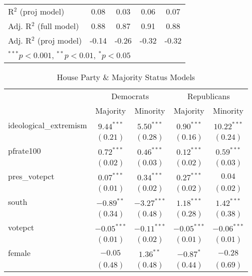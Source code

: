 \documentclass[12pt]{article}
\begin{document}
\begin{table}
\begin{center}
\begin{tabular}{l c c c c }
			R$^2$ (proj model)      & 0.08         & 0.03         & 0.06         & 0.07         \\
			Adj. R$^2$ (full model) & 0.88         & 0.87         & 0.91         & 0.88         \\
			Adj. R$^2$ (proj model) & -0.14        & -0.26        & -0.32        & -0.32        \\
			\hline
			\multicolumn{5}{l}{\scriptsize{$^{***}p<0.001$, $^{**}p<0.01$, $^*p<0.05$}}
		\end{tabular}
	\end{center}
\end{table}	

\begin{table}
	\begin{center}
		\caption{House Party \& Majority Status Models}
		\begin{tabular}{l c c c c }
			\hline
			& \multicolumn{2}{c}{Democrats} & \multicolumn{2}{c}{Republicans} \\
			\cline{2-5}
			& Majority & Minority & Majority & Minority \\
			\hline
			ideological\_extremism & $9.44^{***}$  & $5.50^{***}$  & $0.90^{***}$  & $10.22^{***}$ \\
			& $(0.21)$      & $(0.28)$      & $(0.16)$      & $(0.24)$      \\
			pfrate100              & $0.72^{***}$  & $0.46^{***}$  & $0.12^{***}$  & $0.59^{***}$  \\
			& $(0.02)$      & $(0.03)$      & $(0.02)$      & $(0.03)$      \\
			pres\_votepct          & $0.07^{***}$  & $0.34^{***}$  & $0.27^{***}$  & $0.04$        \\
			& $(0.01)$      & $(0.02)$      & $(0.02)$      & $(0.02)$      \\
			south                  & $-0.89^{**}$  & $-3.27^{***}$ & $1.18^{***}$  & $1.42^{***}$  \\
			& $(0.34)$      & $(0.48)$      & $(0.28)$      & $(0.38)$      \\
			votepct                & $-0.05^{***}$ & $-0.11^{***}$ & $-0.05^{***}$ & $-0.06^{***}$ \\
			& $(0.01)$      & $(0.02)$      & $(0.01)$      & $(0.01)$      \\
			female                 & $-0.05$       & $1.36^{**}$   & $-0.87^{*}$   & $-0.28$       \\
			& $(0.48)$      & $(0.48)$      & $(0.44)$      & $(0.69)$      \\

\end{tabular}
\end{center}
\end{table}
\end{document}

